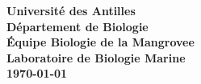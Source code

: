 \begin{titlepage}
\begin{center}
        \textbf{Université des Antilles} \\
        \textbf{Département de Biologie} \\
        \textbf{Équipe Biologie de la Mangrovee} \\
        \textbf{Laboratoire de Biologie Marine} \\
        \vspace{0.5cm}
        \textbf{\today {}}
         
    \end{center}
\end{titlepage}